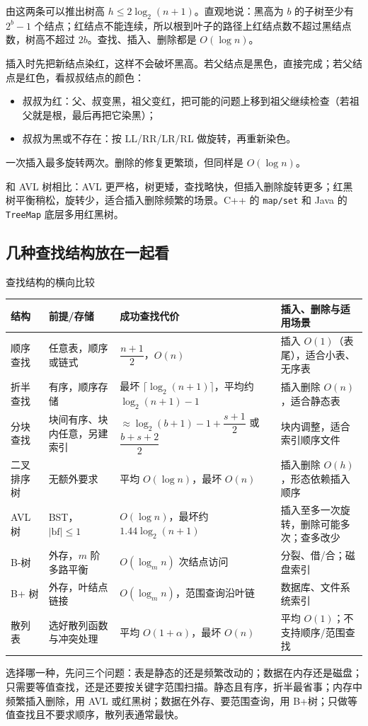 由这两条可以推出树高 $h\le 2\log_2(n+1)$。直观地说：黑高为 $b$ 的子树至少有 $2^b-1$ 个结点；红结点不能连续，所以根到叶子的路径上红结点数不超过黑结点数，树高不超过 $2b$。查找、插入、删除都是 $O(\log n)$。

插入时先把新结点染红，这样不会破坏黑高。若父结点是黑色，直接完成；若父结点是红色，看叔叔结点的颜色：
\begin{itemize}
  \item 叔叔为红：父、叔变黑，祖父变红，把可能的问题上移到祖父继续检查（若祖父就是根，最后再把它染黑）；
  \item 叔叔为黑或不存在：按 LL/RR/LR/RL 做旋转，再重新染色。
\end{itemize}
一次插入最多旋转两次。删除的修复更繁琐，但同样是 $O(\log n)$。

和 AVL 树相比：AVL 更严格，树更矮，查找略快，但插入删除旋转更多；红黑树平衡稍松，旋转少，适合插入删除频繁的场景。C++ 的 \texttt{map/set} 和 Java 的 \texttt{TreeMap} 底层多用红黑树。

\subsection{几种查找结构放在一起看}

\begin{tablebox}{查找结构的横向比较}
\centering
\footnotesize
\begin{tabularx}{\linewidth}{@{}lXX X@{}}
\toprule
结构 & 前提/存储 & 成功查找代价 & 插入、删除与适用场景\\
\midrule
顺序查找 & 任意表，顺序或链式 & $\dfrac{n+1}{2}$，$O(n)$ & 插入 $O(1)$（表尾），适合小表、无序表\\
折半查找 & 有序，顺序存储 & 最坏 $\lceil\log_2(n+1)\rceil$，平均约 $\log_2(n+1)-1$ & 插入删除 $O(n)$，适合静态表\\
分块查找 & 块间有序、块内任意，另建索引 & $\approx\log_2(b+1)-1+\dfrac{s+1}{2}$ 或 $\dfrac{b+s+2}{2}$ & 块内调整，适合索引顺序文件\\
二叉排序树 & 无额外要求 & 平均 $O(\log n)$，最坏 $O(n)$ & 插入删除 $O(h)$，形态依赖插入顺序\\
AVL 树 & BST，$|\mathrm{bf}|\le1$ & $O(\log n)$，最坏约 $1.44\log_2(n+1)$ & 插入至多一次旋转，删除可能多次；查多改少\\
B-树 & 外存，$m$ 阶多路平衡 & $O(\log_m n)$ 次结点访问 & 分裂、借/合；磁盘索引\\
B+ 树 & 外存，叶结点链接 & $O(\log_m n)$，范围查询沿叶链 & 数据库、文件系统索引\\
散列表 & 选好散列函数与冲突处理 & 平均 $O(1+\alpha)$，最坏 $O(n)$ & 平均 $O(1)$；不支持顺序/范围查找\\
\bottomrule
\end{tabularx}
\end{tablebox}

选择哪一种，先问三个问题：表是静态的还是频繁改动的；数据在内存还是磁盘；只需要等值查找，还是还要按关键字范围扫描。静态且有序，折半最省事；内存中频繁插入删除，用 AVL 或红黑树；数据在外存、要范围查询，用 B+树；只做等值查找且不要求顺序，散列表通常最快。

\newpage

